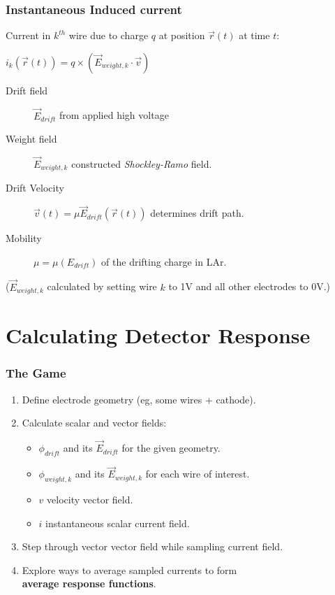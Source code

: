 \documentclass[xcolor=dvipsnames]{beamer}
\begin{document}
\begin{frame}
  \frametitle{Instantaneous Induced current}

  Current in $k^{th}$ wire due to charge $q$ at position $\vec{r}(t)$ at time $t$: \\
  \begin{center}
    $i_k(\vec{r}(t)) = q \times (\vec{E}_{weight,k} \cdot \vec{v})$      
  \end{center}

  \begin{description}
  \item[Drift field] $\vec{E}_{drift}$ from applied high voltage
  \item[Weight field] $\vec{E}_{weight,k}$ constructed \textit{Shockley-Ramo} field.
  \item[Drift Velocity] $\vec{v}(t) = \mu \vec{E}_{drift}(\vec{r}(t))$ determines drift path.
  \item[Mobility] $\mu = \mu(E_{drift})$ of the drifting charge in LAr.
  \end{description}

  \footnotesize
  ($\vec{E}_{weight,k}$ calculated by setting wire $k$ to 1V and all other electrodes to 0V.)

\end{frame}

\section{Calculating Detector Response}

\begin{frame}
  \frametitle{The Game}
  \begin{enumerate}
  \item Define electrode geometry (eg, some wires + cathode).
  \item Calculate scalar and vector fields:
    \begin{itemize}
    \item $\phi_{drift}$ and its $\vec{E}_{drift}$ for the given geometry.
    \item $\phi_{weight,k}$ and its $\vec{E}_{weight,k}$ for each wire of interest.
    \item $v$ velocity vector field.
    \item $i$ instantaneous scalar current field.
    \end{itemize}
  \item Step through vector vector field while sampling current field.
  \item Explore ways to average sampled currents to form \\
    \textbf{average response functions}.
  \end{enumerate}
\end{frame}
\end{document}
